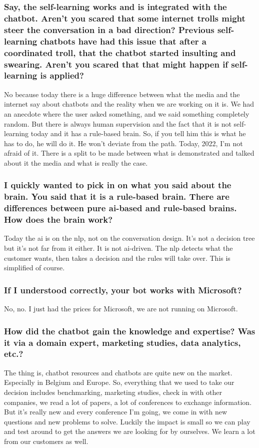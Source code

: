 \begin{appendices}
	\subsubsection{Say, the self-learning works and is integrated with the chatbot. Aren’t you scared that some internet trolls might steer the conversation in a bad direction? Previous self-learning chatbots have had this issue that after a coordinated troll, that the chatbot started insulting and swearing. Aren’t you scared that that might happen if self-learning is applied?}
	No because today there is a huge difference between what the media and the internet say about chatbots and the reality when we are working on it is. We had an anecdote where the user asked something, and we said something completely random. But there is always human supervision and the fact that it is not self-learning today and it has a rule-based brain. So, if you tell him this is what he has to do, he will do it. He won’t deviate from the path. Today, 2022, I’m not afraid of it. There is a split to be made between what is demonstrated and talked about it the media and what is really the case.
	
	\subsubsection{I quickly wanted to pick in on what you said about the brain. You said that it is a rule-based brain. There are differences between pure \acrshort{ai}-based and rule-based brains. How does the brain work?}
	Today the \acrshort{ai} is on the \acrshort{nlp}, not on the conversation design. It’s not a decision tree but it’s not far from it either. It is not \acrshort{ai}-driven. The \acrshort{nlp} detects what the customer wants, then takes a decision and the rules will take over. This is simplified of course.
	
	\subsubsection{If I understood correctly, your bot works with Microsoft?}
	No, no. I just had the prices for Microsoft, we are not running on Microsoft.
	
	\subsubsection{How did the chatbot gain the knowledge and expertise? Was it via a domain expert, marketing studies, data analytics, etc.?}
	The thing is, chatbot resources and chatbots are quite new on the market. Especially in Belgium and Europe. So, everything that we used to take our decision includes benchmarking, marketing studies, check in with other companies, we read a lot of papers, a lot of conferences to exchange information. But it’s really new and every conference I’m going, we come in with new questions and new problems to solve. Luckily the impact is small so we can play and test around to get the answers we are looking for by ourselves. We learn a lot from our customers as well.
	

\end{appendices}
